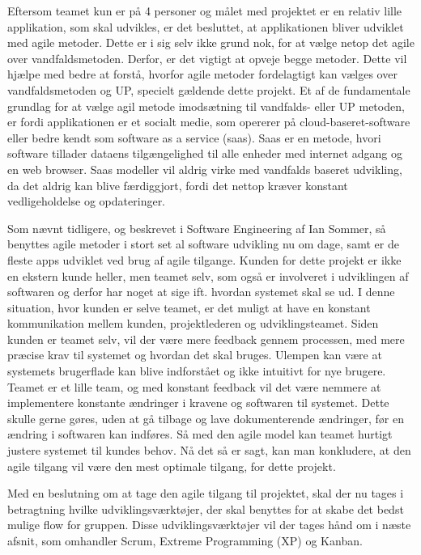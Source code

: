 Eftersom teamet kun er på 4 personer og målet med projektet er en relativ lille applikation, som skal udvikles, er det besluttet, at applikationen bliver udviklet med agile metoder. Dette er i sig selv ikke grund nok, for at vælge netop det agile over vandfaldsmetoden. Derfor, er det vigtigt at opveje begge metoder. Dette vil hjælpe med bedre at forstå, hvorfor agile metoder fordelagtigt kan vælges over vandfaldsmetoden og UP, specielt gældende dette projekt. Et af de fundamentale grundlag for at vælge agil metode imodsætning til vandfalds- eller UP metoden, er fordi applikationen er et socialt medie, som opererer på cloud-baseret-software eller bedre kendt som software as a service (saas). Saas er en metode, hvori software tillader dataens tilgængelighed til alle enheder med internet adgang og en web browser.\cite{Sommerville} Saas modeller vil aldrig virke med vandfalds baseret udvikling, da det aldrig kan blive færdiggjort, fordi det nettop kræver konstant vedligeholdelse og opdateringer.

Som nævnt tidligere, og beskrevet i Software Engineering af Ian Sommer, så benyttes agile metoder i stort set al software udvikling nu om dage, samt er de fleste apps udviklet ved brug af agile tilgange\cite{Sommerville}.  Kunden for dette projekt er ikke en ekstern kunde heller, men teamet selv, som også er involveret i udviklingen af softwaren og derfor har noget at sige ift. hvordan systemet skal se ud. I denne situation, hvor kunden er selve teamet, er det muligt at have en konstant kommunikation mellem kunden, projektlederen og udviklingsteamet. Siden kunden er teamet selv, vil der være mere feedback gennem processen, med mere præcise krav til systemet og hvordan det skal bruges. Ulempen kan være at systemets brugerflade kan blive indforstået og ikke intuitivt for nye brugere. Teamet er et lille team, og med konstant feedback vil det være nemmere at implementere konstante ændringer i kravene og softwaren til systemet. Dette skulle gerne gøres, uden at gå tilbage og lave dokumenterende ændringer, før en ændring i softwaren kan indføres. Så med den agile model kan teamet hurtigt justere systemet til kundes behov. Nå det så er sagt, kan man konkludere, at den agile tilgang vil være den mest optimale tilgang, for dette projekt.

Med en beslutning om at tage den agile tilgang til projektet, skal der nu tages i betragtning hvilke udviklingsværktøjer, der skal benyttes for at skabe det bedst mulige flow for gruppen. Disse udviklingsværktøjer vil der tages hånd om i næste afsnit, som omhandler Scrum, Extreme Programming (XP) og Kanban.
